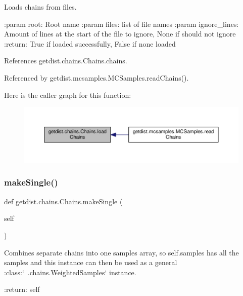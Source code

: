 \begin{DoxyVerb}Loads chains from files.

:param root: Root name
:param files: list of file names
:param ignore_lines: Amount of lines at the start of the file to ignore, None if should not ignore
:return: True if loaded successfully, False if none loaded
\end{DoxyVerb}
 

References getdist.\+chains.\+Chains.\+chains.



Referenced by getdist.\+mcsamples.\+M\+C\+Samples.\+read\+Chains().

Here is the caller graph for this function\+:
\nopagebreak
\begin{figure}[H]
\begin{center}
\leavevmode
\includegraphics[width=350pt]{classgetdist_1_1chains_1_1Chains_afd750faaaf604587c4a978a4d5aa17a1_icgraph}
\end{center}
\end{figure}
\mbox{\label{classgetdist_1_1chains_1_1Chains_abf8a89dbd2d048f01330ed93e6ea226e}} 
\subsubsection{\texorpdfstring{make\+Single()}{makeSingle()}}
{\footnotesize\ttfamily def getdist.\+chains.\+Chains.\+make\+Single (\begin{DoxyParamCaption}\item[{}]{self }\end{DoxyParamCaption})}

\begin{DoxyVerb}Combines separate chains into one samples array, so self.samples has all the samples
and this instance can then be used as a general :class:`~.chains.WeightedSamples` instance.

:return: self
\end{DoxyVerb}
 

